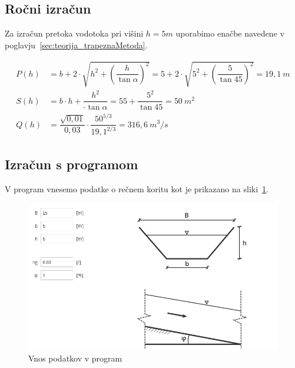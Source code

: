 \subsection{Ročni izračun}
Za izračun pretoka vodotoka pri višini $h=5m$ uporabimo enačbe navedene v poglavju~\ref{sec:teorija_trapeznaMetoda}.

\begin{ceqn}
\begin{align}
 P(h)&= b + 2 \cdot \sqrt{h^2 + \left(\dfrac{h} {\tan\alpha} \right)^{2}} = 5 + 2 \cdot \sqrt{5^2 + \left(\dfrac{5} {\tan 45} \right)^{2}} = 19,1~m \\
 S(h)&= b \cdot h +  \dfrac{h^{2}}{\cdot\tan{\alpha}}   = 5  5 +  \dfrac{5^{2}}{\tan{45}}= 50~m^2 \\
 Q(h)&= \dfrac{\sqrt{0,01}}{0,03} \cdot \dfrac{50^{5/3}}{19,1^{2/3}} = 316,6~m^3/s
\end{align}
\end{ceqn}




\subsection{Izračun s programom}
V program vnesemo podatke o rečnem koritu kot je prikazano na sliki~\ref{fig:trapeznaMetoda_vnosPodatkov}.

\begin{figure}[ht!]
	\begin{centering}
		\includegraphics[width=\textwidth]{slike/izracuni/trapeznaStruga.png}		
		\caption{Vnos podatkov v program}\label{fig:trapeznaMetoda_vnosPodatkov}
	\end{centering}
\end{figure}


